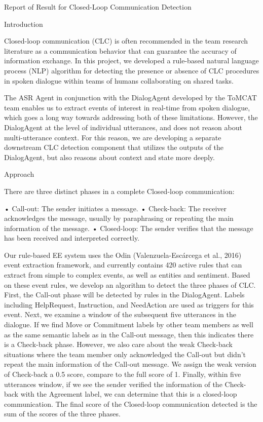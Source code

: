 Report of Result for Closed-Loop Communication Detection


Introduction

Closed-loop communication (CLC) is often recommended in the team research
literature as a communication behavior that can guarantee the accuracy of
information exchange. In this project, we developed a rule-based natural
language process (NLP) algorithm for detecting the presence or absence of CLC
procedures in spoken dialogue within teams of humans collaborating on shared
tasks.

The ASR Agent in conjunction with the DialogAgent developed by the ToMCAT team
enables us to extract events of interest in real-time from spoken dialogue,
which goes a long way towards addressing both of these limitations. However,
the DialogAgent at the level of individual utterances, and does not reason
about multi-utterance context. For this reason, we are developing a separate
downstream CLC detection component that utilizes the outputs of the
DialogAgent, but also reasons about context and state more deeply.

Approach

There are three distinct phases in a complete Closed-loop communication:

• Call-out: The sender initiates a message.
• Check-back: The receiver acknowledges the message, usually by paraphrasing or repeating the main information of the message.
• Closed-loop: The sender verifies that the message has been received and interpreted correctly.

Our rule-based EE system uses the Odin (Valenzuela-Escárcega et al., 2016)
event extraction framework, and currently contains 420 active rules that can
extract from simple to complex events, as well as entities and sentiment. Based
on these event rules, we develop an algorithm to detect the three phases of
CLC. First, the Call-out phase will be detected by rules in the DialogAgent.
Labels including HelpRequest, Instruction, and NeedAction are used as triggers
for this event. Next, we examine a window of the subsequent five utterances in
the dialogue.  If we find Move or Commitment labels by other team members as
well as the same semantic labels as in the Call-out message, then this
indicates there is a Check-back phase. However, we also care about the weak
Check-back situations where the team member only acknowledged the Call-out but
didn’t repeat the main information of the Call-out message. We assign the weak
version of Check-back a 0.5 score, compare to the full score of 1.  Finally,
within five utterances window, if we see the sender verified the information of
the Check-back with the Agreement label, we can determine that this is a
closed-loop communication. The final score of the Closed-loop communication
detected is the sum of the scores of the three phases.

